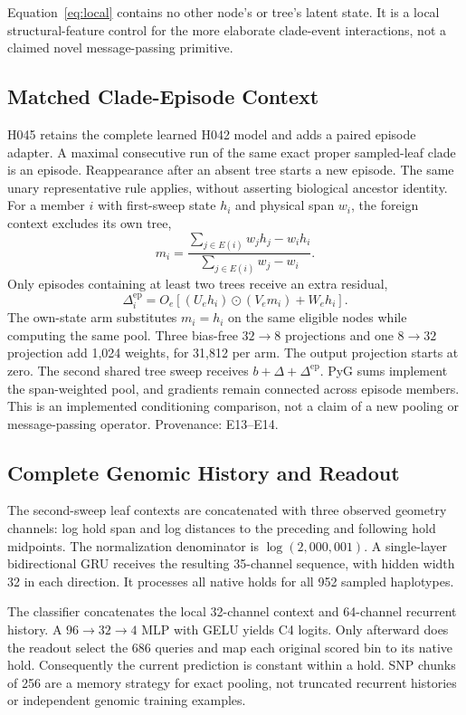 \documentclass[letterpaper]{article}
\begin{document}
Equation~\ref{eq:local} contains no other node's or tree's latent state. It is a local structural-feature control for the more elaborate clade-event interactions, not a claimed novel message-passing primitive.

\subsection{Matched Clade-Episode Context}
\label{sec:episodes}
H045 retains the complete learned H042 model and adds a paired episode adapter. A maximal consecutive run of the same exact proper sampled-leaf clade is an episode. Reappearance after an absent tree starts a new episode. The same unary representative rule applies, without asserting biological ancestor identity. For a member $i$ with first-sweep state $h_i$ and physical span $w_i$, the foreign context excludes its own tree,
\begin{equation}
m_i=\frac{\sum_{j\in E(i)}w_jh_j-w_ih_i}
           {\sum_{j\in E(i)}w_j-w_i}.
\end{equation}
Only episodes containing at least two trees receive an extra residual,
\begin{equation}
\Delta_i^{\mathrm{ep}}=
O_e\!\left[(U_eh_i)\odot(V_em_i)+W_eh_i\right].
\end{equation}
The own-state arm substitutes $m_i=h_i$ on the same eligible nodes while computing the same pool. Three bias-free $32\to8$ projections and one $8\to32$ projection add 1,024 weights, for 31,812 per arm. The output projection starts at zero. The second shared tree sweep receives $b+\Delta+\Delta^{\mathrm{ep}}$. PyG sums implement the span-weighted pool, and gradients remain connected across episode members. This is an implemented conditioning comparison, not a claim of a new pooling or message-passing operator. Provenance: E13--E14.

\subsection{Complete Genomic History and Readout}
The second-sweep leaf contexts are concatenated with three observed geometry channels: log hold span and log distances to the preceding and following hold midpoints. The normalization denominator is $\log(2{,}000{,}001)$. A single-layer bidirectional GRU receives the resulting 35-channel sequence, with hidden width 32 in each direction. It processes all native holds for all 952 sampled haplotypes.

The classifier concatenates the local 32-channel context and 64-channel recurrent history. A $96\to32\to4$ MLP with GELU yields C4 logits. Only afterward does the readout select the 686 queries and map each original scored bin to its native hold. Consequently the current prediction is constant within a hold. SNP chunks of 256 are a memory strategy for exact pooling, not truncated recurrent histories or independent genomic training examples.
\end{document}
